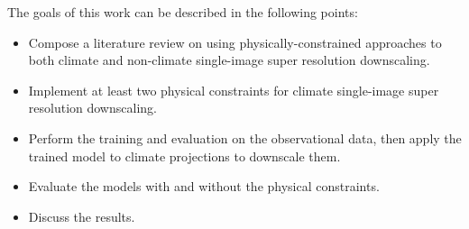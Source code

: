 The goals of this work can be described in the following points:
\begin{itemize}
    \item Compose a literature review on using physically-constrained approaches to both climate and non-climate single-image super resolution downscaling.
    \item Implement at least two physical constraints for climate single-image super resolution downscaling.
    \item Perform the training and evaluation on the observational data, then apply the trained model to climate projections to downscale them.
    \item Evaluate the models with and without the physical constraints.
    \item Discuss the results.
\end{itemize}
